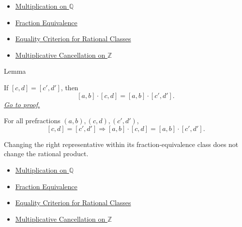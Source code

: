 \begin{dependencies}
\begin{itemize}
  \item \hyperref[def:multiplication-on-q-classes]{Multiplication on $\mathbb{Q}$}
  \item \hyperref[def:fraction-equivalence]{Fraction Equivalence}
  \item \hyperref[prop:equality-criterion-for-rational-classes]{Equality Criterion for Rational Classes}
  \item \hyperref[cor:multiplicative-cancellation-on-z]{Multiplicative Cancellation on $\mathbb{Z}$}
\end{itemize}
\end{dependencies}

\begin{lemmabox}{Lemma}
\begin{lemma}
\label{lem:multiplication-on-q-respects-right-equivalence}
If $[c,d]=[c',d']$, then
\[
[a,b]\cdot[c,d]=[a,b]\cdot[c',d'].
\]
\hyperref[prf:multiplication-on-q-respects-right-equivalence]{\textit{Go to proof.}}
\end{lemma}
\end{lemmabox}

\begin{remark*}
For all prefractions $(a,b),(c,d),(c',d')$,
\[
[c,d]=[c',d']
\Longrightarrow
[a,b]\cdot[c,d]=[a,b]\cdot[c',d'].
\]
\end{remark*}

\begin{remark*}[Interpretation]
Changing the right representative within its fraction-equivalence class does
not change the rational product.
\end{remark*}

\begin{dependencies}
\begin{itemize}
  \item \hyperref[def:multiplication-on-q-classes]{Multiplication on $\mathbb{Q}$}
  \item \hyperref[def:fraction-equivalence]{Fraction Equivalence}
  \item \hyperref[prop:equality-criterion-for-rational-classes]{Equality Criterion for Rational Classes}
  \item \hyperref[cor:multiplicative-cancellation-on-z]{Multiplicative Cancellation on $\mathbb{Z}$}
\end{itemize}
\end{dependencies}

